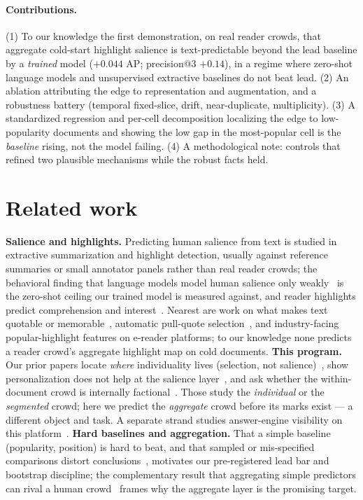 \documentclass[11pt]{article}
\begin{document}
\paragraph{Contributions.}
(1) To our knowledge the first demonstration, on real reader crowds, that aggregate cold-start
highlight salience is text-predictable beyond the lead baseline by a \emph{trained} model
($+0.044$ AP; precision@3 $+0.14$), in a regime where zero-shot language models and unsupervised
extractive baselines do not beat lead. (2) An ablation attributing the edge to representation
and augmentation, and a robustness battery (temporal fixed-slice, drift, near-duplicate,
multiplicity). (3) A standardized regression and per-cell decomposition localizing the edge to
low-popularity documents and showing the low gap in the most-popular cell is the \emph{baseline} rising, not
the model failing. (4) A methodological note: controls that refined two plausible mechanisms
while the robust facts held.

\section{Related work}
\textbf{Salience and highlights.} Predicting human salience from text is studied in extractive
summarization and highlight detection, usually against reference summaries or small annotator
panels rather than real reader crowds; the behavioral finding that language models model human
salience only weakly~\cite{trienes2025} is the zero-shot ceiling our trained model is measured
against, and reader highlights predict comprehension and interest~\cite{winchell2020}. Nearest are
work on what makes text quotable or memorable~\cite{danescu2012}, automatic pull-quote
selection~\cite{bohn2020}, and industry-facing popular-highlight features on e-reader platforms;
to our knowledge none predicts a reader crowd's aggregate highlight map on cold documents.
\textbf{This program.} Our prior papers locate \emph{where} individuality lives (selection, not
salience)~\cite{nakayashiki2026salience}, show personalization does not help at the salience
layer~\cite{nakayashiki2026selection}, and ask whether the within-document crowd is internally
factional~\cite{nakayashiki2026factions}. Those study the \emph{individual} or the
\emph{segmented} crowd; here we predict the \emph{aggregate} crowd before its marks exist --- a
different object and task. A separate strand studies answer-engine visibility on this
platform~\cite{watanabe2026aeo}.
\textbf{Hard baselines and aggregation.} That a simple baseline (popularity, position) is hard
to beat, and that sampled or mis-specified comparisons distort
conclusions~\cite{krichene2020,revisitpop2020}, motivates our pre-registered lead bar and
bootstrap discipline; the complementary result that aggregating simple predictors can rival a
human crowd~\cite{schoenegger2024,park2024} frames why the aggregate layer is the promising
target.
\end{document}
